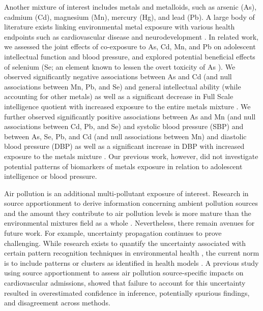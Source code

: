 Another mixture of interest includes metals and metalloids, such as arsenic (As), cadmium (Cd), magnesium (Mn), mercury (Hg), and lead (Pb). A large body of literature exists linking environmental metal exposure with various health endpoints such as cardiovascular disease \citep{nigra2016environmental} and neurodevelopment \citep{henn2012associations}. In related work, we assessed the joint effects of co-exposure to As, Cd, Mn, and Pb on adolescent intellectual function and blood pressure, and explored potential beneficial effects of selenium (Se; an element known to lessen the overt toxicity of As \citep{levander1977metabolic}). We observed significantly negative associations between As and Cd (and null associations between Mn, Pb, and Se) and general intellectual ability (while accounting for other metals) as well as a significant decrease in Full Scale intelligence quotient with increased exposure to the entire metals mixture \citep{wasserman2018cross}. We further observed significantly positive associations between As and Mn (and null associations between Cd, Pb, and Se) and systolic blood pressure (SBP) and between As, Se, Pb, and Cd (and null associations between Mn) and diastolic blood pressure (DBP) as well as a significant increase in DBP with increased exposure to the metals mixture \citep{chen2019early}. Our previous work, however, did not investigate potential patterns of biomarkers of metals exposure in relation to adolescent intelligence or blood pressure.

Air pollution is an additional multi-pollutant exposure of interest. Research in source apportionment to derive information concerning ambient pollution sources and the amount they contribute to air pollution levels is more mature than the environmental mixtures field as a whole \citep{paatero94, sun2020positive, krall2017associations}. Nevertheless, there remain avenues for future work. For example, uncertainty propagation continues to prove challenging. While research exists to quantify the uncertainty associated with certain pattern recognition techniques in environmental health \citep{park2015part, gass2015ensemble}, the current norm is to include patterns or clusters as identified in health models \citep{austin2012framework, zanobetti2014health, sarnat2008fine, krall2017associations, basagana2016neurodevelopmental, siponen2015source, dai2016fine}. A previous study using source apportionment to assess air pollution source-specific impacts on cardiovascular admissions, \citet{mak14_unc} showed that failure to account for this uncertainty resulted in overestimated confidence in inference, potentially spurious findings, and disagreement across methods.

